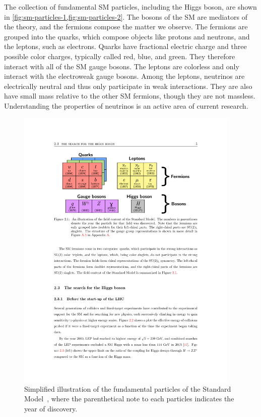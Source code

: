 The collection of fundamental SM particles, including the Higgs boson, are shown in \cref{fig:sm-particles-1,fig:sm-particles-2}. The bosons of the SM are mediators of the theory, and the fermions compose the matter we observe. The fermions are grouped into the quarks, which compose objects like protons and neutrons, and the leptons, such as electrons. Quarks have fractional electric charge and three possible color charges, typically called red, blue, and green. They therefore interact with all of the SM gauge bosons. The leptons are colorless and only interact with the electroweak gauge bosons. Among the leptons, neutrinos are electrically neutral and thus only participate in weak interactions. They are also have small mass relative to the other SM fermions, though they are not massless. Understanding the properties of neutrinos is an active area of current research.

\begin{figure}[tp]
  \centering
  \includegraphics[width=0.95\textwidth]{figures/standardmodel/particles_reece}
  \caption{Simplified illustration of the fundamental particles of the Standard Model~\cite{2013.thesis.ryan}, where the parenthetical note to each particles indicates the year of discovery.}
  \label{fig:sm-particles-1}
\end{figure}

